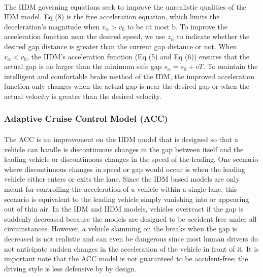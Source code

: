\documentclass[12pt]{article}
\begin{document}
\paragraph{}
The IIDM governing equations seek to improve the unrealistic qualities of the IDM model. Eq (8) is the free acceleration equation, which limits the deceleration's magnitude when $v_\alpha>v_0$ to be at most b. To improve the acceleration function near the desired speed, we use $z_\alpha$ to indicate whether the desired gap distance is greater than the current gap distance or not.  When $v_\alpha < v_0$, the IIDM's acceleration function (Eq (5) and Eq (6)) ensures that the actual gap is no larger than the minimum safe gap $s_\alpha = s_0+vT$.  To maintain the intelligent and comfortable brake method of the IDM, the improved acceleration function only changes when the actual gap is near the desired gap or when the actual velocity is greater than the desired velocity.
\subsubsection{Adaptive Cruise Control Model (ACC)}
\paragraph{}
The ACC is an improvement on the IIDM model that is designed so that a vehicle can handle is discontinuous changes in the gap between itself and the leading vehicle or discontinuous changes in the speed of the leading.  One scenario where discontinuous changes in speed or gap would occur is when the leading vehicle either enters or exits the lane.  Since the IDM based models are only meant for controlling the acceleration of a vehicle within a single lane, this scenario is equivalent to the leading vehicle simply vanishing into or appearing out of thin air.  In the IDM and IIDM models, vehicles overreact if the gap is suddenly decreased because the models are designed to be accident free under all circumstances.  However, a vehicle slamming on the breaks when the gap is decreased is not realistic and can even be dangerous since most human drivers do not anticipate sudden changes in the acceleration of the vehicle in front of it.  It is important note that the ACC model is not guaranteed to be accident-free; the driving style is less defensive by by design.
\end{document}
